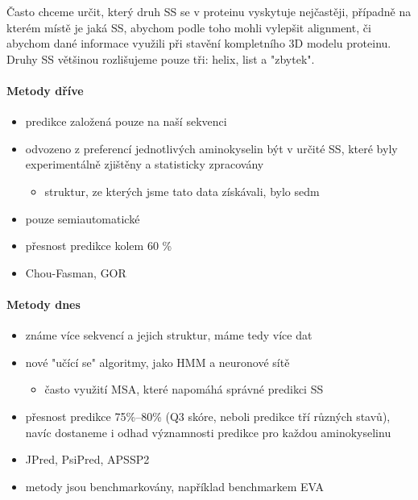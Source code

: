 \documentclass[DIV=8]{scrreprt}
\begin{document}
Často chceme určit, který druh SS se v proteinu vyskytuje nejčastěji, případně na kterém místě je jaká SS, abychom podle toho mohli vylepšit alignment, či abychom dané informace využili při stavění kompletního 3D modelu proteinu. Druhy SS většinou rozlišujeme pouze tři: helix, list a "zbytek".

\paragraph{Metody dříve}
\begin{itemize}[nosep]
    \item predikce založená pouze na naší sekvenci
    \item odvozeno z preferencí jednotlivých aminokyselin být v určité SS, které byly experimentálně zjištěny a statisticky zpracovány
\begin{itemize}[nosep]
    \item struktur, ze kterých jsme tato data získávali, bylo sedm
\end{itemize}

    \item pouze semiautomatické
    \item přesnost predikce kolem 60 \%
    \item Chou-Fasman, GOR
\end{itemize}



\paragraph{Metody dnes}
\begin{itemize}[nosep]
    \item známe více sekvencí a jejich struktur, máme tedy více dat
    \item nové "učící se" algoritmy, jako HMM a neuronové sítě
\begin{itemize}[nosep]
    \item často využití MSA, které napomáhá správné predikci SS
\end{itemize}

    \item přesnost predikce 75\%--80\% (Q3 skóre, neboli predikce tří různých stavů), navíc dostaneme i odhad významnosti predikce pro každou aminokyselinu
    \item JPred, PsiPred, APSSP2
    \item metody jsou benchmarkovány, například benchmarkem EVA
\end{itemize}
\end{document}
